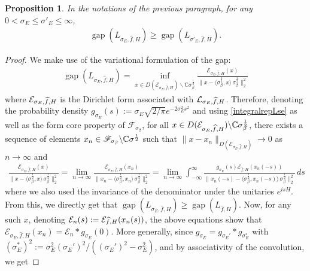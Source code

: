 \documentclass[11pt]{amsart}
\newcommand{\1}{\mathbbm{1}}
\theoremstyle{plain}
\newtheorem{proposition}[theorem]{Proposition}
\theoremstyle{definition}
\theoremstyle{remark}
\numberwithin{equation}{section}
\begin{document}
\begin{proposition}\label{lem.gapmonoton} In the notations of the previous paragraph, for any $0< \sigma_E\le \sigma'_E\le \infty$,
\begin{align*}
\operatorname{gap}(L_{\sigma_E,\widehat{f},H})\ge \operatorname{gap}(L_{\sigma'_E,\widehat{f},H}).
\end{align*}
\end{proposition}
\begin{proof}
We make use of the variational formulation of the gap:
\begin{align*}
\operatorname{gap}({L}_{\sigma_E,\widehat{f},H})=\inf_{x\in D(\mathcal{E}_{\sigma_E,\widehat{f},H})\backslash \mathbb{C}\sigma_\beta^{\frac{1}{2}}}\frac{\mathcal{E}_{\sigma_E,\widehat{f},H}(x)}{\Big\|x-\langle \sigma_\beta^{\frac{1}{2}},x\rangle\,\sigma_\beta^{\frac{1}{2}}\Big\|_{2}^2}
\end{align*}
where $\mathcal{E}_{\smash{\sigma_E,\widehat{f},H}}$ is the Dirichlet form associated with $\mathcal{L}_{\smash{\sigma_E,\widehat{f},H}}$. Therefore, denoting the probability density $g_{\sigma_E}(s):=\sigma_E\sqrt{2/\pi}e^{-2\sigma_E^2s^2}$ and using \eqref{integralrepLse} as well as the form core property of $\mathscr{F}_{\sigma_\beta}$, for all $x\in D(\mathcal{E}_{\sigma_E,\widehat{f},H})\backslash \mathbb{C}\sigma_\beta^{\smash{\frac{1}{2}}}$,  there exists a sequence of elements $x_n\in\mathscr{F}_{\sigma_\beta}\backslash \mathbb{C}\sigma^{\smash{\frac{1}{2}}}$ such that $\|x-x_n\|_{D(\mathcal{E}_{\sigma_E,\widehat{f},H})}\to 0$ as $n\to\infty$ and
\begin{align}
 \tfrac{\mathcal{E}_{\sigma_E,\widehat{f},H}(x)}{\Big\|x-\langle \sigma_\beta^{\frac{1}{2}},x\rangle\,\sigma_\beta^{\frac{1}{2}}\Big\|_{2}^2}=\lim_{n\to\infty}\tfrac{\mathcal{E}_{\sigma_E,\widehat{f},H}(x_n)}{\Big\|x_n-\langle \sigma_\beta^{\frac{1}{2}},x_n\rangle\,\sigma_\beta^{\frac{1}{2}}\Big\|_{2}^2}=\lim_{n\to\infty} \int_{-\infty}^{\infty}  \tfrac{g_{\sigma_E}(s)\mathcal{E}_{\widehat{f},H}(x_n(-s))}{\Big\|x_n(-s)-\langle \sigma_\beta^{\frac{1}{2}},x_n(-s)\rangle\,\sigma_\beta^{\frac{1}{2}}\Big\|_{2}^2}\,ds \nonumber   
\end{align}
where we also used the invariance of the denominator under the unitaries $e^{isH}$. From this, we directly get that $\operatorname{gap}({L}_{\sigma_E,\widehat{f},H})\ge \operatorname{gap}({L}_{\widehat{f},H}) $. Now, for any such $x$, denoting $\mathcal{E}_n(s):=\mathcal{E}_{\smash{\widehat{f},H}}(x_n(s))$, the above equations show that $\mathcal{E}_{\sigma_E,\widehat{f},H}(x_n)= \mathcal{E}_n\ast g_{\sigma_E}(0)$. More generally, since $g_{\sigma_E}=g_{\sigma_E'}\ast  g_{\sigma_E^*}$ with $(\sigma_E^*)^2:=\sigma_E^2(\sigma_E')^2/((\sigma_E')^2-\sigma_E^2)$, and by associativity of the convolution, we get

\end{proof}
\end{document}
